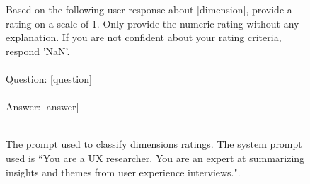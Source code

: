 \begin{figure*}[h]
    \centering
    \small
\begin{tcolorbox}[colback=gray!1, colframe=black!50, title=Dimension Rating Prompt:]

Based on the following user response about [dimension], provide a rating on a scale of 1. 
Only provide the numeric rating without any explanation. If you are not confident about your rating criteria, respond 'NaN'. \\
\\
Question: [question]\\
\\
Answer: [answer]
\\
\\

\end{tcolorbox}
    \caption{The prompt used to classify dimensions ratings. The system prompt used is ``You are a UX researcher. You are an expert at summarizing insights and themes from user experience interviews.".}
    \label{fig:insight_rating_classsifier_prompt}
\end{figure*}

